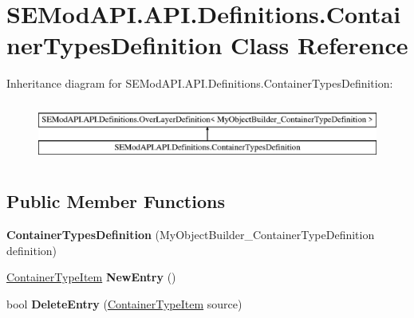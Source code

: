 \hypertarget{class_s_e_mod_a_p_i_1_1_a_p_i_1_1_definitions_1_1_container_types_definition}{}\section{S\+E\+Mod\+A\+P\+I.\+A\+P\+I.\+Definitions.\+Container\+Types\+Definition Class Reference}
\label{class_s_e_mod_a_p_i_1_1_a_p_i_1_1_definitions_1_1_container_types_definition}
Inheritance diagram for S\+E\+Mod\+A\+P\+I.\+A\+P\+I.\+Definitions.\+Container\+Types\+Definition\+:\begin{figure}[H]
\begin{center}
\leavevmode
\includegraphics[height=2.000000cm]{class_s_e_mod_a_p_i_1_1_a_p_i_1_1_definitions_1_1_container_types_definition}
\end{center}
\end{figure}
\subsection*{Public Member Functions}
\begin{DoxyCompactItemize}
\item 
\hypertarget{class_s_e_mod_a_p_i_1_1_a_p_i_1_1_definitions_1_1_container_types_definition_ab6609473f8e011109e1888d56fc96941}{}{\bfseries Container\+Types\+Definition} (My\+Object\+Builder\+\_\+\+Container\+Type\+Definition definition)\label{class_s_e_mod_a_p_i_1_1_a_p_i_1_1_definitions_1_1_container_types_definition_ab6609473f8e011109e1888d56fc96941}

\item 
\hypertarget{class_s_e_mod_a_p_i_1_1_a_p_i_1_1_definitions_1_1_container_types_definition_aa2e32178682343f9efdee70cc736cb4b}{}\hyperlink{class_s_e_mod_a_p_i_1_1_a_p_i_1_1_definitions_1_1_container_type_item}{Container\+Type\+Item} {\bfseries New\+Entry} ()\label{class_s_e_mod_a_p_i_1_1_a_p_i_1_1_definitions_1_1_container_types_definition_aa2e32178682343f9efdee70cc736cb4b}

\item 
\hypertarget{class_s_e_mod_a_p_i_1_1_a_p_i_1_1_definitions_1_1_container_types_definition_a4a70538bf2e3a53e91191de86681ceba}{}bool {\bfseries Delete\+Entry} (\hyperlink{class_s_e_mod_a_p_i_1_1_a_p_i_1_1_definitions_1_1_container_type_item}{Container\+Type\+Item} source)\label{class_s_e_mod_a_p_i_1_1_a_p_i_1_1_definitions_1_1_container_types_definition_a4a70538bf2e3a53e91191de86681ceba}

\end{DoxyCompactItemize}
